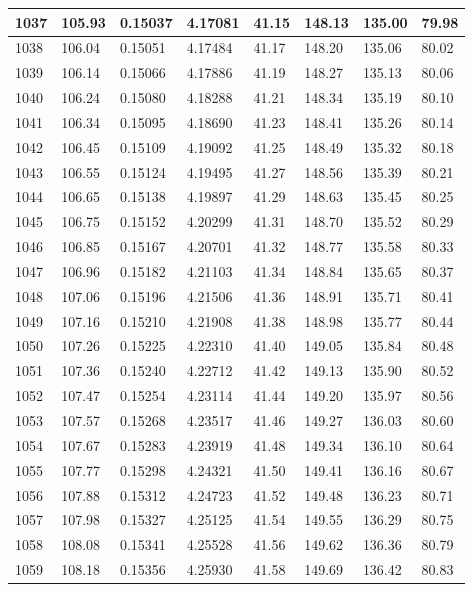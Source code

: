 \documentclass[12pt,a4paper,twoside]{article}
\begin{document}
\begin{center}
\begin{longtable}{l l l l | l l l l}
1037 & 105.93 & 0.15037 & 4.17081 & 41.15 & 148.13 & 135.00 & 79.98 \\ \hline
1038 & 106.04 & 0.15051 & 4.17484 & 41.17 & 148.20 & 135.06 & 80.02 \\ \hline
1039 & 106.14 & 0.15066 & 4.17886 & 41.19 & 148.27 & 135.13 & 80.06 \\ \hline
1040 & 106.24 & 0.15080 & 4.18288 & 41.21 & 148.34 & 135.19 & 80.10 \\ \hline
1041 & 106.34 & 0.15095 & 4.18690 & 41.23 & 148.41 & 135.26 & 80.14 \\ \hline
1042 & 106.45 & 0.15109 & 4.19092 & 41.25 & 148.49 & 135.32 & 80.18 \\ \hline
1043 & 106.55 & 0.15124 & 4.19495 & 41.27 & 148.56 & 135.39 & 80.21 \\ \hline
1044 & 106.65 & 0.15138 & 4.19897 & 41.29 & 148.63 & 135.45 & 80.25 \\ \hline
1045 & 106.75 & 0.15152 & 4.20299 & 41.31 & 148.70 & 135.52 & 80.29 \\ \hline
1046 & 106.85 & 0.15167 & 4.20701 & 41.32 & 148.77 & 135.58 & 80.33 \\ \hline
1047 & 106.96 & 0.15182 & 4.21103 & 41.34 & 148.84 & 135.65 & 80.37 \\ \hline
1048 & 107.06 & 0.15196 & 4.21506 & 41.36 & 148.91 & 135.71 & 80.41 \\ \hline
1049 & 107.16 & 0.15210 & 4.21908 & 41.38 & 148.98 & 135.77 & 80.44 \\ \hline
1050 & 107.26 & 0.15225 & 4.22310 & 41.40 & 149.05 & 135.84 & 80.48 \\ \hline
1051 & 107.36 & 0.15240 & 4.22712 & 41.42 & 149.13 & 135.90 & 80.52 \\ \hline
1052 & 107.47 & 0.15254 & 4.23114 & 41.44 & 149.20 & 135.97 & 80.56 \\ \hline
1053 & 107.57 & 0.15268 & 4.23517 & 41.46 & 149.27 & 136.03 & 80.60 \\ \hline
1054 & 107.67 & 0.15283 & 4.23919 & 41.48 & 149.34 & 136.10 & 80.64 \\ \hline
1055 & 107.77 & 0.15298 & 4.24321 & 41.50 & 149.41 & 136.16 & 80.67 \\ \hline
1056 & 107.88 & 0.15312 & 4.24723 & 41.52 & 149.48 & 136.23 & 80.71 \\ \hline
1057 & 107.98 & 0.15327 & 4.25125 & 41.54 & 149.55 & 136.29 & 80.75 \\ \hline
1058 & 108.08 & 0.15341 & 4.25528 & 41.56 & 149.62 & 136.36 & 80.79 \\ \hline
1059 & 108.18 & 0.15356 & 4.25930 & 41.58 & 149.69 & 136.42 & 80.83 \\ \hline

\end{longtable}
\end{center}
\end{document}
